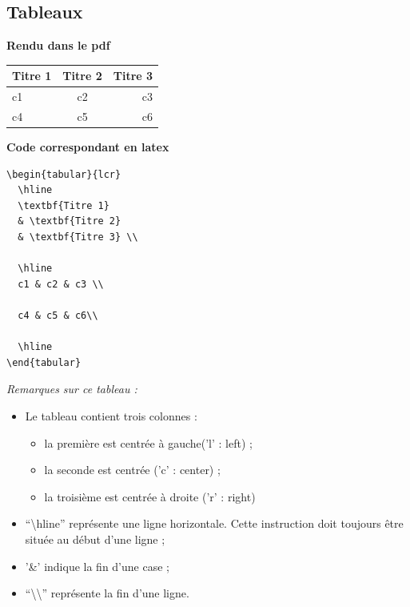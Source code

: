 \documentclass[12pt]{report}
\begin{document}
\subsection{Tableaux}

\begin{minipage}[t]{.45\linewidth}
\textbf{Rendu dans le pdf}
\vspace{.5cm}

\begin{tabular}{lcr}
  \hline
  \textbf{Titre 1} 
  & \textbf{Titre 2} 
  & \textbf{Titre 3} \\

  \hline
  c1 & c2 & c3 \\

  c4 & c5 & c6\\

  \hline
\end{tabular}
\end{minipage}\hfill\vrule\hfill
\begin{minipage}[t]{.45\linewidth}
\textbf{Code correspondant en latex}

\begin{verbatim}
\begin{tabular}{lcr}
  \hline
  \textbf{Titre 1} 
  & \textbf{Titre 2} 
  & \textbf{Titre 3} \\

  \hline
  c1 & c2 & c3 \\

  c4 & c5 & c6\\

  \hline
\end{tabular}
\end{verbatim}
\end{minipage}






\textit{Remarques sur ce tableau :}
\begin{itemize}
\item Le tableau contient trois colonnes :
  \begin{itemize}
  \item la première est centrée à gauche('l' : left) ;
  \item la seconde est centrée ('c' : center) ;
  \item la troisième est centrée à droite ('r' : right)
  \end{itemize}
\item ``\textbackslash hline'' représente une ligne horizontale. Cette
  instruction doit toujours \^etre située au début d'une ligne ;
\item '\&' indique la fin d'une case ;
\item ``\textbackslash\textbackslash'' représente la fin d'une ligne.
\end{itemize}
\vspace{.3cm}
\end{document}
